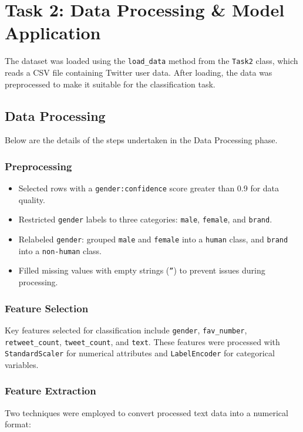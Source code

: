 \documentclass[a4paper,11pt]{article}
\begin{document}
\section{Task 2: Data Processing \& Model Application}

The dataset was loaded using the \texttt{load\_data} method from the \texttt{Task2} class, which reads a CSV file containing Twitter user data. After loading, the data was preprocessed to make it suitable for the classification task.

\subsection{Data Processing}

Below are the details of the steps undertaken in the Data Processing phase.

\subsubsection*{Preprocessing}
\begin{itemize}
    \item Selected rows with a \texttt{gender:confidence} score greater than 0.9 for data quality.
    \item Restricted \texttt{gender} labels to three categories: \texttt{male}, \texttt{female}, and \texttt{brand}.
    \item Relabeled \texttt{gender}: grouped \texttt{male} and \texttt{female} into a \texttt{human} class, and \texttt{brand} into a \texttt{non-human} class.
    \item Filled missing values with empty strings (\texttt{''}) to prevent issues during processing.
\end{itemize}

\subsubsection*{Feature Selection}
Key features selected for classification include \texttt{gender}, \texttt{fav\_number}, \texttt{retweet\_count}, \texttt{tweet\_count}, and \texttt{text}. These features were processed with \texttt{StandardScaler} for numerical attributes and \texttt{LabelEncoder} for categorical variables.

\subsubsection*{Feature Extraction}
Two techniques were employed to convert processed text data into a numerical format:
\end{document}
